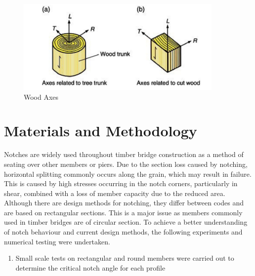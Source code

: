 \documentclass[11pt,a4paper]{article}
\numberwithin{equation}{subsection}
\begin{document}
\begin{figure}[h]
	\begin{center}
		\includegraphics[scale=0.9]{Wood_Axes}
	\end{center}
 	\caption{Wood Axes \cite{porteous_structural_2013}}
 	\label{fig:Axes}
\end{figure}

\vspace*{\baselineskip}
\pagebreak

\section{Materials and Methodology}
Notches are widely used throughout timber bridge construction as a method of seating over other members or piers. Due to the section loss caused by notching, horizontal splitting commonly occurs along the grain, which may result in failure. This is caused by high stresses occurring in the notch corners, particularly in shear, combined with a loss of member capacity due to the reduced area. Although there are design methods for notching, they differ between codes and are based on rectangular sections. This is a major issue as members commonly used in timber bridges are of circular section. To achieve a better understanding of notch behaviour and current design methods, the following experiments and numerical testing were undertaken. 

	\begin{enumerate}
		\item Small scale tests on rectangular and round members were carried out to determine the critical notch angle for each profile
	\end{enumerate}
\end{document}
